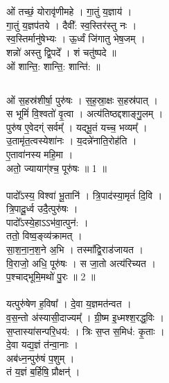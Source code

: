 \section{}
\subsection{}
ओं तच्छं॒ योरावृ॑णीमहे । गा॒तुं य॒ज्ञाय॑ ।\\
गा॒तुं य॒ज्ञप॑तये । दैवी᳚: स्व॒स्तिर॑स्तु नः ।\\
स्व॒स्तिर्मानु॑षेभ्यः । ऊ॒र्ध्वं जि॑गातु भेष॒जम् ।\\
शन्नो॑ अस्तु द्वि॒पदे᳚ । शं चतु॑ष्पदे ॥\\
ओं शान्ति॒: शान्ति॒: शान्ति॑: ॥ \\
\subsection{}
ओं स॒हस्र॑शीर्षा॒ पुरु॑षः । स॒ह॒स्रा॒क्षः स॒हस्र॑पात् ।\\
स भूमिं॑ वि॒श्वतो॑ वृ॒त्वा । अत्य॑तिष्ठद्दशाङ्गु॒लम् ।\\
पुरु॑ष ए॒वेदग्ं सर्वम्᳚ । यद्भू॒तं यच्च॒ भव्यम्᳚ ।\\
उ॒तामृ॑त॒त्वस्येशा॑नः । य॒दन्ने॑नाति॒रोह॑ति ।\\
ए॒तावा॑नस्य महि॒मा ।\\
अतो॒ ज्यायाग्॑श्च॒ पूरु॑षः ॥ 1 ॥\\
\\
पादो᳚ऽस्य॒ विश्वा॑ भू॒तानि॑ । त्रि॒पाद॑स्या॒मृतं॑ दि॒वि ।\\
त्रि॒पादू॒र्ध्व उदै॒त्पुरु॑षः ।\\
पादो᳚ऽस्ये॒हाऽऽभ॑वा॒त्पुन॑: ।\\
ततो॒ विष्व॒ङ्व्य॑क्रामत् ।\\
सा॒श॒ना॒न॒श॒ने अ॒भि । तस्मा᳚द्वि॒राड॑जायत ।\\
वि॒राजो॒ अधि॒ पूरु॑षः । स जा॒तो अत्य॑रिच्यत ।\\
प॒श्चाद्भूमि॒मथो॑ पु॒रः ॥ 2 ॥\\
\\
यत्पुरु॑षेण ह॒विषा᳚ । दे॒वा य॒ज्ञमत॑न्वत ।\\
व॒स॒न्तो अ॑स्यासी॒दाज्यम्᳚ । ग्री॒ष्म इ॒ध्मश्श॒रद्ध॒विः ।\\
स॒प्तास्या॑सन्परि॒धय॑: । त्रिः स॒प्त स॒मिध॑: कृ॒ताः ।\\
दे॒वा यद्य॒ज्ञं त॑न्वा॒नाः ।\\
अब॑ध्न॒न्पुरु॑षं प॒शुम् ।\\
तं य॒ज्ञं ब॒र्हिषि॒ प्रौक्षन्॑ ।\\
